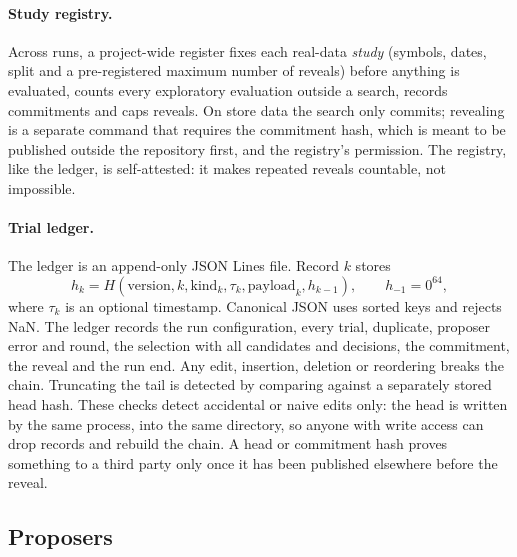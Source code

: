 \paragraph{Study registry.} Across runs, a project-wide register fixes each
real-data \emph{study} (symbols, dates, split and a pre-registered maximum
number of reveals) before anything is evaluated, counts every exploratory
evaluation outside a search, records commitments and caps reveals. On store
data the search only commits; revealing is a separate command that requires
the commitment hash, which is meant to be published outside the repository
first, and the registry's permission. The registry, like the ledger, is
self-attested: it makes repeated reveals countable, not impossible.

\paragraph{Trial ledger.} The ledger is an append-only JSON Lines file. Record
$k$ stores
\[
h_k=H(\text{version},k,\text{kind}_k,\tau_k,\text{payload}_k,h_{k-1}),\qquad h_{-1}=0^{64},
\]
where $\tau_k$ is an optional timestamp. Canonical JSON uses sorted keys and
rejects NaN. The ledger records the run configuration, every trial,
duplicate, proposer error and round, the selection with all candidates and
decisions, the commitment, the reveal and the run end. Any edit, insertion,
deletion or reordering breaks the chain. Truncating the tail is detected by
comparing against a separately stored head hash. These checks detect
accidental or naive edits only: the head is written by the same process,
into the same directory, so anyone with write access can drop records and
rebuild the chain. A head or commitment hash proves something to a third
party only once it has been published elsewhere before the reveal.

\subsection{Proposers}
\label{sec:proposers}

